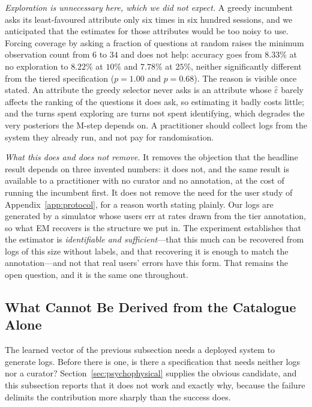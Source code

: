 \emph{Exploration is unnecessary here, which we did not expect.} A greedy
incumbent asks its least-favoured attribute only six times in six hundred
sessions, and we anticipated that the estimates for those attributes would be
too noisy to use. Forcing coverage by asking a fraction of questions at random
raises the minimum observation count from $6$ to $34$ and does not help:
accuracy goes from $8.33\%$ at no exploration to $8.22\%$ at $10\%$ and $7.78\%$
at $25\%$, neither significantly different from the tiered specification
($p = 1.00$ and $p = 0.68$). The reason is visible once stated. An attribute the
greedy selector never asks is an attribute whose $\hat\varepsilon$ barely
affects the ranking of the questions it does ask, so estimating it badly costs
little; and the turns spent exploring are turns not spent identifying, which
degrades the very posteriors the M-step depends on. A practitioner should
collect logs from the system they already run, and not pay for randomisation.

\emph{What this does and does not remove.} It removes the objection that the
headline result depends on three invented numbers: it does not, and the same
result is available to a practitioner with no curator and no annotation, at the
cost of running the incumbent first. It does not remove the need for the user
study of Appendix~\ref{app:protocol}, for a reason worth stating plainly. Our
logs are generated by a simulator whose users err at rates drawn from the tier
annotation, so what EM recovers is the structure we put in. The experiment
establishes that the estimator is \emph{identifiable and sufficient}---that this
much can be recovered from logs of this size without labels, and that recovering
it is enough to match the annotation---and not that real users' errors have this
form. That remains the open question, and it is the same one throughout.

\subsection{What Cannot Be Derived from the Catalogue Alone}
\label{sec:results-psycho}

The learned vector of the previous subsection needs a deployed system to
generate logs. Before there is one, is there a specification that needs neither
logs nor a curator? Section~\ref{sec:psychophysical} supplies the obvious
candidate, and this subsection reports that it does not work and exactly why,
because the failure delimits the contribution more sharply than the success
does.

